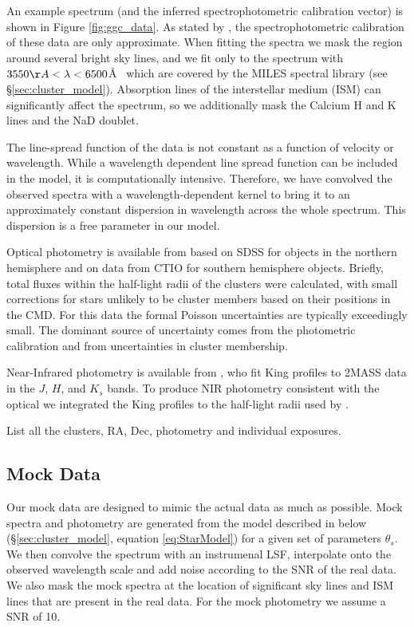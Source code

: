 \documentclass[iop,numberedappendix]{emulateapj}
\begin{document}
An example spectrum (and the inferred spectrophotometric calibration
vector) is shown in Figure \ref{fig:ggc_data}.  As stated by
\citet{schiavon05}, the spectrophotometric calibration of these data
are only approximate.  When fitting the spectra we mask the region
around  several bright sky lines, and we fit only to the spectrum
with $3550\AA < \lambda < 6500$\AA~ which are covered by the MILES
spectral library (see \S\ref{sec:cluster_model}).  Absorption lines of
the interstellar medium (ISM) can significantly affect the spectrum,
so we additionally mask the Calcium H and K lines and the NaD doublet.

The line-spread function of the data is not constant as a function of
velocity or wavelength.  While a wavelength dependent line spread
function can be included in the model, it is computationally
intensive. Therefore, we have convolved the observed spectra with a
wavelength-dependent kernel to bring it to an approximately constant
dispersion in wavelength across the whole spectrum. This dispersion is
a free parameter in our model.

Optical photometry is available from \citet{vanderbeke14} based on
SDSS for objects in the northern hemisphere and on data from CTIO for
southern hemisphere objects.  Briefly, total fluxes within the half-light radii
of the clusters \citep{harris96} were calculated, with small
corrections for stars unlikely to be cluster members based on their
positions in the CMD. For this data the formal Poisson uncertainties
are typically exceedingly small.  The dominant source of uncertainty
comes from the photometric calibration and from uncertainties in
cluster membership.

Near-Infrared photometry is available from \citet{cohen07}, who fit
King profiles \citet{king62} to 2MASS data in the $J$, $H$, and $K_s$
bands.  To produce NIR photometry consistent with the optical we
integrated the King profiles to the half-light radii used by
\citet{vanderbeke14}.

\begin{table}[h!]
\caption{List all the clusters, RA, Dec, photometry and individual exposures.}
\end{table}


\subsection{Mock Data}
Our mock data are designed to mimic the actual data as much as
possible.  Mock spectra and photometry are generated from the model
described in below (\S\ref{sec:cluster_model}, equation
\ref{eq:StarModel}) for a given set of parameters $\theta_s$.  We then
convolve the spectrum with an instrumenal LSF, interpolate onto the
observed wavelength scale and add noise according to the SNR of the
real data.  We also mask the mock spectra at the location of
significant sky lines and ISM lines that are present in the real data.
For the mock photometry we assume a SNR of 10.
\end{document}
